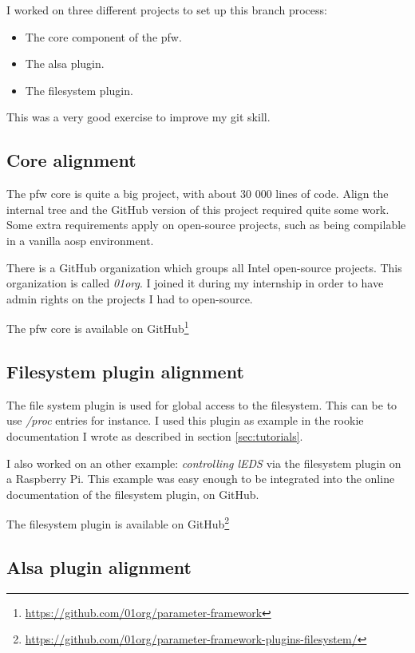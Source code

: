I worked on three different projects to set up this branch process:
\begin{itemize}
    \item The core component of the \gls{pfw}.
    \item The \gls{alsa} plugin.
    \item The filesystem plugin.
\end{itemize}

This was a very good exercise to improve my \gls{git} skill.

\subsection{Core alignment}
The \gls{pfw} core is quite a big project, with about 30 000 lines of code.
Align the internal tree and the \gls{GitHub} version of this project required quite some work.
Some extra requirements apply on open-source projects, such as being compilable in a vanilla \gls{aosp} environment.

There is a \gls{GitHub} organization which groups all Intel open-source projects. This
organization is called \emph{01org}. I joined it during my internship in order to have admin rights
on the projects I had to open-source.

The \gls{pfw} core is available on \gls{GitHub}\footnote{\url{https://github.com/01org/parameter-framework}}

\subsection{Filesystem plugin alignment}

The file system plugin is used for global access to the filesystem. This can be to
use \emph{/proc} entries for instance. I used this plugin as example in the rookie
documentation I wrote as described in section \ref{sec:tutorials}.

I also worked on an other example: \emph{controlling lEDS} via the filesystem
plugin on a Raspberry Pi.  This example was easy enough to be integrated into
the online documentation of the filesystem plugin, on \gls{GitHub}.

The filesystem plugin is available on \gls{GitHub}\footnote{\url{https://github.com/01org/parameter-framework-plugins-filesystem/}}

\subsection{Alsa plugin alignment}

